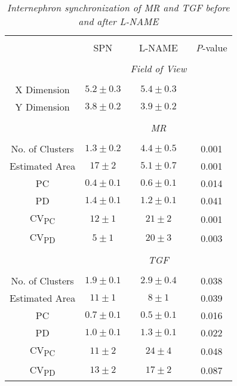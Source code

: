 \begin{table}[h]
\begin{center}
	\caption[Summary of synchronization during Control and L-NAME]{\emph{Internephron synchronization of MR and TGF before and after L-NAME}}
	\begin{tabular}{c c c c}
		 &         &          & \\
 		 & SPN & L-NAME & \emph{P}-value \\
		 &         &          & \\
		 &         & \emph{Field of View} & \\
		 &         &          & \\
 		X Dimension & $5.2 \pm 0.3$ & $5.4 \pm 0.3$ & \\ 
		Y Dimension & $3.8 \pm 0.2$ & $3.9 \pm 0.2$ & \\
		 &         &          & \\
		 &         & \emph{MR} & \\
		 &         &          & \\
		 No. of Clusters & $1.3 \pm 0.2$ & $4.4 \pm 0.5$ & 0.001 \\
		Estimated Area & $17 \pm 2$ & $5.1 \pm 0.7$ & 0.001 \\
		PC & $0.4 \pm 0.1$ & $0.6 \pm 0.1$ & 0.014 \\
		PD & $1.4 \pm 0.1$ & $1.2 \pm 0.1$ & 0.041 \\
		CV\textsubscript{PC} & $12 \pm 1$ & $21 \pm 2$ & 0.001 \\
		CV\textsubscript{PD} & $5 \pm 1$ & $20 \pm 3$ & 0.003 \\
				 &         &          & \\
		 &         & \emph{TGF} & \\
		 &         &          & \\
		 No. of Clusters & $1.9 \pm 0.1$ & $2.9 \pm 0.4$ & 0.038 \\
		Estimated Area & $11 \pm 1$ & $8 \pm 1$ & 0.039 \\
		PC & $0.7 \pm 0.1$ & $0.5 \pm 0.1$ & 0.016 \\
		PD & $1.0 \pm 0.1$ & $1.3 \pm 0.1$ & 0.022 \\
		CV\textsubscript{PC} & $11 \pm 2$ & $24 \pm 4$ & 0.048 \\
		CV\textsubscript{PD} & $13 \pm 2$ & $17 \pm 2$ & 0.087 \\
	\end{tabular}
		
\end{center}
\end{table}
	
